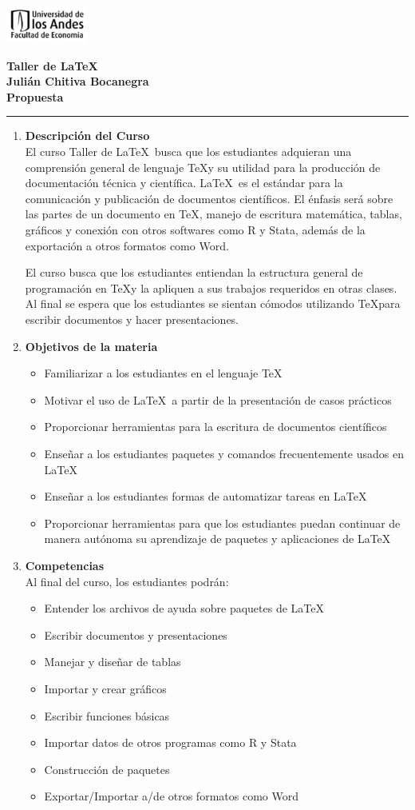 \documentclass[12pt]{article}
\newcommand{\encabezado}{\vspace*{-2.5cm}
\begin{multicols}{2}

    \includegraphics[width=0.2\textwidth]{img/logo_econ.png}
    
\columnbreak

\begin{flushright}
\textbf{\large Taller de \LaTeX\ }\\
\textbf{\large Julián Chitiva Bocanegra}\\
\textbf{\small Propuesta}\\
\end{flushright}

\end{multicols}\vspace*{-1cm}
\noindent\rule{\linewidth}{1pt}}
\begin{document}
\vspace*{0.8cm}
\encabezado

\begin{enumerate}[label={\bfseries\arabic*.}]
    \item \textbf{Descripción del Curso}\\
El curso Taller de \LaTeX\ busca que los estudiantes adquieran una comprensión general de lenguaje \TeX y su utilidad para la producción de documentación técnica y científica. \LaTeX\ es el estándar para la comunicación y publicación de documentos científicos. El énfasis será sobre las partes de un documento en \TeX, manejo de escritura matemática, tablas, gráficos y conexión con otros softwares como R y Stata, además de la exportación a otros formatos como Word.

El curso busca que los estudiantes entiendan la estructura general de programación en \TeX y la apliquen a sus trabajos requeridos en otras clases. Al final se espera que los estudiantes se sientan cómodos utilizando \TeX para escribir documentos y hacer presentaciones.

\item \textbf{Objetivos de la materia}

\begin{itemize}
    \item Familiarizar a los estudiantes en el lenguaje \TeX
    \item Motivar el uso de \LaTeX\ a partir de la presentación de casos prácticos
    \item Proporcionar herramientas para la escritura de documentos científicos
    \item Enseñar a los estudiantes paquetes y comandos frecuentemente usados en \LaTeX
    \item Enseñar a los estudiantes formas de automatizar tareas en \LaTeX
    \item Proporcionar herramientas para que los estudiantes puedan continuar de manera autónoma su
    aprendizaje de paquetes y aplicaciones de \LaTeX
\end{itemize}

\item \textbf{Competencias}\\
Al final del curso, los estudiantes podrán:
\begin{itemize}
    \item Entender los archivos de ayuda sobre paquetes de \LaTeX
    \item Escribir documentos y presentaciones
    \item Manejar y diseñar de tablas
    \item Importar y crear gráficos
    \item Escribir funciones básicas
    \item Importar datos de otros programas como R y Stata
    \item Construcción de paquetes
    \item Exportar/Importar a/de otros formatos como Word
\end{itemize}


\end{enumerate}
\end{document}
